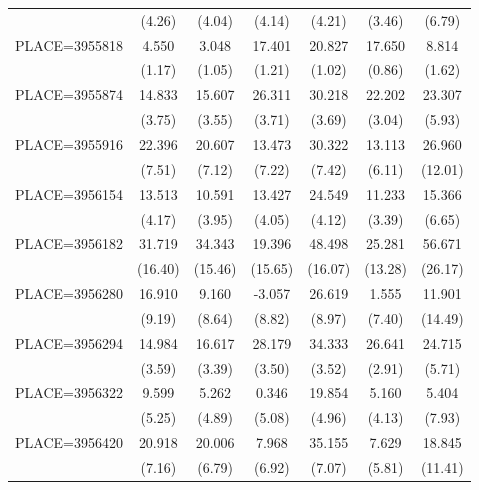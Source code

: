 {\begin{tabular}{l*{6}{c}}
                    &      (4.26)&      (4.04)&      (4.14)&      (4.21)&      (3.46)&      (6.79)\\
PLACE=3955818       &       4.550&       3.048&      17.401&      20.827&      17.650&       8.814\\
                    &      (1.17)&      (1.05)&      (1.21)&      (1.02)&      (0.86)&      (1.62)\\
PLACE=3955874       &      14.833&      15.607&      26.311&      30.218&      22.202&      23.307\\
                    &      (3.75)&      (3.55)&      (3.71)&      (3.69)&      (3.04)&      (5.93)\\
PLACE=3955916       &      22.396&      20.607&      13.473&      30.322&      13.113&      26.960\\
                    &      (7.51)&      (7.12)&      (7.22)&      (7.42)&      (6.11)&     (12.01)\\
PLACE=3956154       &      13.513&      10.591&      13.427&      24.549&      11.233&      15.366\\
                    &      (4.17)&      (3.95)&      (4.05)&      (4.12)&      (3.39)&      (6.65)\\
PLACE=3956182       &      31.719&      34.343&      19.396&      48.498&      25.281&      56.671\\
                    &     (16.40)&     (15.46)&     (15.65)&     (16.07)&     (13.28)&     (26.17)\\
PLACE=3956280       &      16.910&       9.160&      -3.057&      26.619&       1.555&      11.901\\
                    &      (9.19)&      (8.64)&      (8.82)&      (8.97)&      (7.40)&     (14.49)\\
PLACE=3956294       &      14.984&      16.617&      28.179&      34.333&      26.641&      24.715\\
                    &      (3.59)&      (3.39)&      (3.50)&      (3.52)&      (2.91)&      (5.71)\\
PLACE=3956322       &       9.599&       5.262&       0.346&      19.854&       5.160&       5.404\\
                    &      (5.25)&      (4.89)&      (5.08)&      (4.96)&      (4.13)&      (7.93)\\
PLACE=3956420       &      20.918&      20.006&       7.968&      35.155&       7.629&      18.845\\
                    &      (7.16)&      (6.79)&      (6.92)&      (7.07)&      (5.81)&     (11.41)\\

\end{tabular}}
